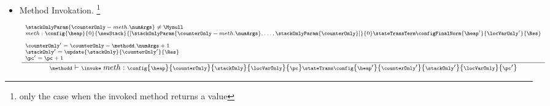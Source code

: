 \begin{itemize}
           The stack top element  must be a reference of an object of type \\ \Throwable. 
	  If there is a handler that protects this bytecode instruction from the exception thrown, the control is transfered
	  to the instruction at which the exception handler starts\footnote{for every method the ExceptionHandler
	  table describes the corresponding exception handler by the limits of the 
	  region it protects, the Exception that it catches, and the instruction at which it starts}.
	  If the object on the stack top is \Mynull, a \NullPointerExc \ is thrown. 

 \item Method Invokation. \invoke \footnote{ only the case when  the invoked method returns a value}
      
         $$ {\scriptsize \frac{\begin{array}{l} \stackOnlyParam{ \counterOnly - meth.\numArgs } \neq \Mynull   \\
	                         meth : %
			                        \config{\heap}       
                                                       {0}
						       {\newStack }
                                                       {\lbrack \stackOnlyParam{ \counterOnly - meth.\numArgs },\ldots ,\stackOnlyParam{ \counterOnly} \rbrack }
						       {0} 
						         \stateTransTerm 
							 \configFinalNorm{\heap'}{\locVarOnly'}{\Res}\\
                                                   \\
						   \counterOnly' = \counterOnly - \methodd.\numArgs + 1 \\
						   \stackOnly' = \update{\stackOnly}{\counterOnly'}{\Res} \\
						   \pc' = \pc + 1
			         \end{array} 	      
	         }	         
	         {\methodd \vdash \invoke \  meth :  \config{\heap}{\counterOnly}{\stackOnly}{\locVarOnly}{\pc} 
		                        \stateTrans  
					\config{\heap' }{\counterOnly'}{\stackOnly' }{\locVarOnly}{\pc'}} } $$
	  

\end{itemize}
